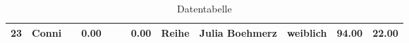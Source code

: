 \begin{table}
\begin{center}
{\begin{tabular}{rllrllrlllrr}
  23 & Conni                                                                                                                                                                                                                                                           &                                                                                                                                                                                                                                                                 & 0.00 &                                                                                                                                                                                                                                                                 &                                                                                                                                                                                                                                                                 & 0.00 & Reihe & Julia Boehmerz                                                                                                                                                                                                                                                  & weiblich & 94.00 & 22.00 \\ 
   \hline
\end{tabular}
}
\caption{Datentabelle}
\label{merkmale}
\end{center}
\end{table}%
